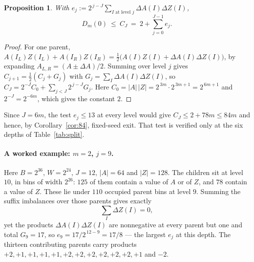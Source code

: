 \documentclass[11pt,a4paper]{article}
\theoremstyle{plain}
\newtheorem{proposition}[theorem]{Proposition}
\theoremstyle{definition}
\theoremstyle{remark}
\begin{document}
\begin{proposition}\label{prop:bins}
With $e_j:=2^{\,j-J}\sum_{I\text{ at level }j}\Delta A(I)\Delta Z(I)$,
\[
D_m(0)\ \le\ C_J\ =\ 2+\sum_{j=0}^{J-1}e_j .
\]
\end{proposition}

\begin{proof}
For one parent, $A(I_L)Z(I_L)+A(I_R)Z(I_R)=\tfrac12\bigl(A(I)Z(I)+\Delta
A(I)\Delta Z(I)\bigr)$, by expanding $A_{L,R}=(A\pm\Delta A)/2$. Summing over
level $j$ gives $C_{j+1}=\tfrac12(C_j+G_j)$ with
$G_j=\sum_{I}\Delta A(I)\Delta Z(I)$, so
$C_J=2^{-J}C_0+\sum_{j<J}2^{\,j-J}G_j$. Here
$C_0=|A|\,|Z|=2^{\,3m}\cdot2^{\,3m+1}=2^{\,6m+1}$ and $2^{-J}=2^{-6m}$, which
gives the constant $2$.
\end{proof}

Since $J=6m$, the test $e_j\le13$ at every level would give $C_J\le2+78m\le84m$
and hence, by Corollary~\ref{cor:84}, fixed-seed exit. That test is verified
only at the six depths of Table~\ref{tab:split}.

\paragraph{A worked example: $m=2$, $j=9$.} Here $B=2^{36}$, $W=2^{24}$,
$J=12$, $|A|=64$ and $|Z|=128$. The children sit at level $10$, in bins of
width $2^{26}$: $125$ of them contain a value of $A$ or of $Z$, and $78$
contain a value of $Z$. These lie under $110$ occupied parent bins at level
$9$. Summing the suffix imbalances over those parents gives exactly
\[
\sum_{I}\Delta Z(I)=0,
\]
yet the products $\Delta A(I)\Delta Z(I)$ are nonnegative at every parent but
one and total $G_9=17$, so $e_9=17/2^{\,12-9}=17/8$ --- the largest $e_j$ at
this depth. The thirteen contributing parents carry products
$+2,+1,+1,+1,+1,+2,+2,+2,+2,+2,+2,+1$ and $-2$.
\end{document}
